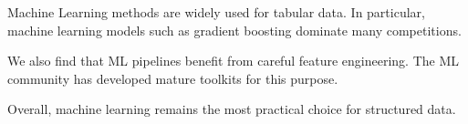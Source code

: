 Machine Learning methods are widely used for tabular data. In particular, machine learning models such as gradient boosting dominate many competitions.

We also find that ML pipelines benefit from careful feature engineering. The ML community has developed mature toolkits for this purpose.

Overall, machine learning remains the most practical choice for structured data.
